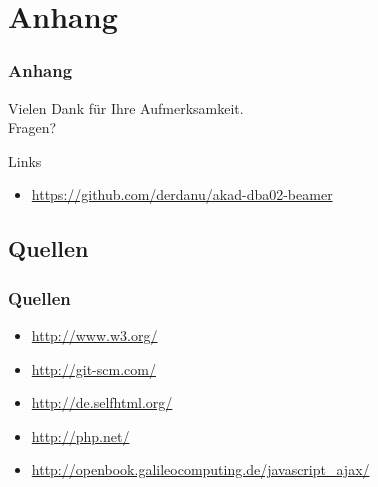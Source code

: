 \documentclass[xcolor=dvipsnames]{beamer}
\begin{document}
\section{Anhang}
\begin{frame}
  \frametitle{Anhang} %
	\begin{block}{}	
		\begin{center}
			Vielen Dank für Ihre Aufmerksamkeit. \\
			Fragen?
		\end{center}	
	\end{block}
	\begin{block}{Links}	
		\begin{itemize}
			\item \url{https://github.com/derdanu/akad-dba02-beamer}						
		\end{itemize}
	\end{block}
\end{frame}

\subsection{Quellen}
\begin{frame} %
  \frametitle{Quellen} %
 	\begin{itemize}
		\item \url{http://www.w3.org/}
		\item \url{http://git-scm.com/}
		\item \url{http://de.selfhtml.org/}
		\item \url{http://php.net/}
		\item \url{http://openbook.galileocomputing.de/javascript_ajax/}
	\end{itemize}
\end{frame}
\end{document}
